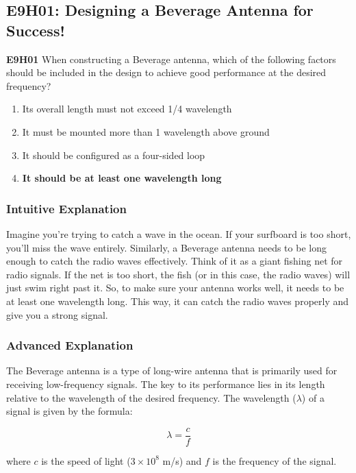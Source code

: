 \subsection{E9H01: Designing a Beverage Antenna for Success!}

\begin{tcolorbox}[colback=gray!10!white,colframe=black!75!black,title=Multiple Choice Question]
    \textbf{E9H01} When constructing a Beverage antenna, which of the following factors should be included in the design to achieve good performance at the desired frequency?
    \begin{enumerate}[label=\Alph*.]
        \item Its overall length must not exceed 1/4 wavelength
        \item It must be mounted more than 1 wavelength above ground
        \item It should be configured as a four-sided loop
        \item \textbf{It should be at least one wavelength long}
    \end{enumerate}
\end{tcolorbox}

\subsubsection{Intuitive Explanation}
Imagine you're trying to catch a wave in the ocean. If your surfboard is too short, you'll miss the wave entirely. Similarly, a Beverage antenna needs to be long enough to catch the radio waves effectively. Think of it as a giant fishing net for radio signals. If the net is too short, the fish (or in this case, the radio waves) will just swim right past it. So, to make sure your antenna works well, it needs to be at least one wavelength long. This way, it can catch the radio waves properly and give you a strong signal.

\subsubsection{Advanced Explanation}
The Beverage antenna is a type of long-wire antenna that is primarily used for receiving low-frequency signals. The key to its performance lies in its length relative to the wavelength of the desired frequency. The wavelength (\(\lambda\)) of a signal is given by the formula:

\[
\lambda = \frac{c}{f}
\]

where \(c\) is the speed of light (\(3 \times 10^8\) m/s) and \(f\) is the frequency of the signal.


